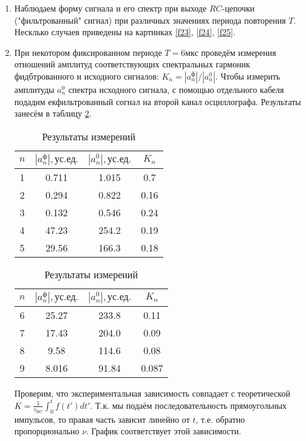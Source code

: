 \documentclass[a4paper,12pt]{article} %
\begin{document}
\begin{enumerate}
    \item Наблюдаем форму сигнала и его спектр при выходе $RC$-цепочки ("фильтрованный" сигнал) при различных значениях периода повторения $T$. Несклько случаев приведены на картинках \ref{f23}, \ref{f24}, \ref{f25}.

    \item При некотором фиксированном периоде $T = 6 \text{мкс}$ проведём измерения отношений амплитуд соответствующих спектральных гармоник фидбтрованного и исходного сигналов: $K_{n} = |a_{n}^{ф}|/|a_{n}^{0}|$. Чтобы измерить амплитуды $a_{n}^{0}$ спектра исходного сигнала, с помощью отдельного кабеля подадим екфильтрованный согнал на второй канал осциллографа. Результаты занесём в таблицу \ref{tab7}.


    \begin{table}[h]
	\centering
		\begin{tabular}{|c|c|c|c|}
			\hline
                $n$ & $|a_{n}^{ф}|, \text{ус.ед.}$ & $|a_{n}^{0}|, \text{ус.ед.}$ & $K_{n}$ \\ \hline
                1 & 0.711 & 1.015 & 0.7 \\ \hline
                2 & 0.294 & 0.822 & 0.16 \\ \hline
                3 & 0.132 & 0.546 & 0.24 \\ \hline
                4 & 47.23 & 254.2 & 0.19 \\ \hline
                5 & 29.56 & 166.3 & 0.18 \\ \hline
		\end{tabular}
            \hspace{.02\textwidth}
            \begin{tabular}{|c|c|c|c|}
			\hline
                $n$ & $|a_{n}^{ф}|, \text{ус.ед.}$ & $|a_{n}^{0}|, \text{ус.ед.}$ & $K_{n}$ \\ \hline
                6 & 25.27 & 233.8 & 0.11 \\ \hline
                7 & 17.43 & 204.0 & 0.09 \\ \hline
                8 & 9.58 & 114.6 & 0.08 \\ \hline
                9 & 8.016 & 91.84 & 0.087 \\ \hline
		\end{tabular}
	\caption{Результаты измерений}
        \label{tab7}
    \end{table}

    Проверим, что экспериментальная зависимость совпадает с теоретической $K = \frac{1}{\tau_\text{RC}} \int_0^t f(t')dt'$. Т.к. мы подаём последовательность прямоугольных импульсов, то правая часть зависит линейно от $t$, т.е. обратно пропорционально $\nu$. График соответствует этой зависимости.
    
\end{enumerate}
\end{document}
